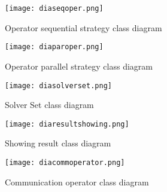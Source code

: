 \begin{figure}
	\centering
	\texttt{[image: diaseqoper.png]}
	\caption[]{Operator sequential strategy class diagram}\label{diag:seqoperstr}
\end{figure}

\begin{figure}
	\centering
	\texttt{[image: diaparoper.png]}
	\caption[]{Operator parallel strategy class diagram}\label{diag:paroperstr}
\end{figure}

\begin{figure}
	\centering
	\texttt{[image: diasolverset.png]}
	\caption[]{Solver Set class diagram}\label{diag:solverset}
\end{figure}

\clearpage 

\begin{figure}
	\centering
	\texttt{[image: diaresultshowing.png]}
	\caption[]{Showing result class diagram}\label{diag:showingres}
\end{figure}

\begin{figure}
	\centering
	\texttt{[image: diacommoperator.png]}
	\caption[]{Communication operator class diagram}\label{diag:commoper}
\end{figure}